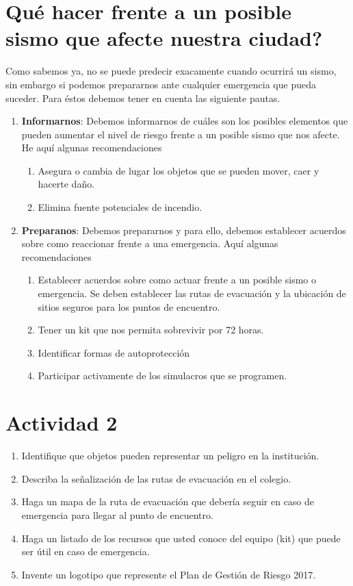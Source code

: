 \documentclass[10pt,twoside]{article}
\begin{document}
\begin{multicols}{2}
\section*{Qué hacer frente a un posible sismo que afecte nuestra ciudad?}
Como sabemos ya, no se puede predecir exacamente cuando ocurrirá un sismo, sin embargo si podemos prepararnos ante cualquier emergencia que pueda suceder. Para éstos debemos tener en cuenta las siguiente pautas.
\begin{enumerate}
\item \textbf{Informarnos}: Debemos informarnos de cuáles son los posibles elementos que pueden aumentar el nivel de riesgo frente a un posible sismo que nos afecte. He aquí algunas recomendaciones
\begin{enumerate}
\item Asegura o cambia de lugar los objetos que se pueden mover, caer y hacerte daño.
\item Elimina fuente potenciales de incendio.
\end{enumerate}
\item \textbf{Preparanos}: Debemos prepararnos y para ello, debemos establecer acuerdos sobre como reaccionar frente a una emergencia. Aquí algunas recomendaciones
\begin{enumerate}
\item Establecer acuerdos sobre como actuar frente a un posible sismo o emergencia. Se deben establecer las rutas de evacuación y la ubicación de sitios seguros para los puntos de encuentro.
\item Tener un kit que nos permita sobrevivir por 72 horas.
\item Identificar formas de autoprotección
\item Participar activamente de los simulacros que se programen.
\end{enumerate}
\end{enumerate}
\section*{Actividad 2}
\begin{enumerate}
\item Identifique que objetos pueden representar un peligro en la institución.
\item Describa la señalización de las rutas de evacuación en el colegio.
\item Haga un mapa de la ruta de evacuación que debería seguir en caso de emergencia para llegar al punto de encuentro.
\item Haga un listado de los recursos que usted conoce del equipo (kit) que puede ser útil en caso de emergencia.
\item Invente un logotipo que represente el Plan de Gestión de Riesgo 2017.
\end{enumerate}
\end{multicols}
\end{document}
